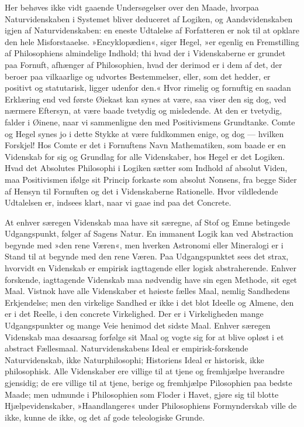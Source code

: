 \documentclass[12pt]{book}
\newcommand{\apage}[1]{\marginnote{\footnotesize\textit{[#1]}}}
\begin{document}
Her behøves ikke vidt gaaende Undersøgelser over den Maade, hvorpaa
Naturvidenskaben i Systemet bliver deduceret af Logiken, og
Aandsvidenskaben igjen af Naturvidenskaben: en eneste Udtalelse af
Forfatteren er nok til at opklare den hele Misforstaaelse. »Encyklopædien«,
siger Hegel, »er egenlig en Fremstilling af Philosophiens almindelige
Indhold; thi hvad der i Videnskaberne er grundet paa Fornuft, afhænger af
Philosophien, hvad der derimod er i dem af det, der beroer paa vilkaarlige
og udvortes Bestemmelser, eller, som det hedder, er positivt og statutarisk,
ligger udenfor den.« Hvor rimelig og fornuftig en saadan Erklæring end ved
første Øiekast kan synes at være, saa viser den sig dog, ved nærmere
Eftersyn, at være baade tvetydig og misledende. At den er tvetydig, falder
i Øinene, naar vi sammenligne den med Positivismens Grundtanke. Comte og
Hegel synes jo i dette Stykke at være fuldkommen enige, og dog --- hvilken Forskjel! Hos Comte er det i Fornuftens Navn Mathematiken, som baade er en
Videnskab for sig og Grundlag for alle Videnskaber, hos Hegel er det
Logiken. Hvad det Absolutes Philosophi i Logiken sætter som Indhold af
absolut Viden, maa Positivismen \apage{89} ifølge sit Princip forkaste som absolut
Nonsens, fra begge Sider af Hensyn til Fornuften og det i Videnskaberne
Rationelle. Hvor vildledende Udtalelsen er, indsees klart, naar vi gaae ind
paa det Concrete.

At enhver særegen Videnskab maa have sit særegne, af Stof og Emne betingede
Udgangspunkt, følger af Sagens Natur. En immanent Logik kan ved Abstraction
begynde med »den rene Væren«, men hverken Astronomi eller Mineralogi er i
Stand til at begynde med den rene Væren. Paa Udgangspunktet sees det strax,
hvorvidt en Videnskab er empirisk iagttagende eller logisk abstraherende.
Enhver forskende, iagttagende Videnskab maa nødvendig have sin egen
Methode, sit eget Maal. Vistnok have alle Videnskaber et høieste fælles
Maal, nemlig Sandhedens Erkjendelse; men den virkelige Sandhed er ikke i
det blot Ideelle og Almene, den er i det Reelle, i den concrete
Virkelighed. Der er i Virkeligheden mange Udgangspunkter og mange Veie
henimod det sidste Maal. Enhver særegen Videnskab maa desaarsag forfølge
sit Maal og vogte sig for at blive opløst i et abstract Fællesmaal.
Naturvidenskabens Ideal er empirisk-forskende Naturvidenskab, ikke
Naturphilosophi; Historiens Ideal er historisk, ikke philosophisk. Alle
Videnskaber ere villige til at tjene og fremhjælpe hverandre gjensidig; de
ere villige til at tjene, berige og fremhjælpe Pilosophien paa bedste
Maade; men udmunde i Philosophien som Floder i Havet, gjøre sig til blotte
Hjælpevidenskaber, »Haandlangere« under Philosophiens Formynderskab \apage{90} ville
de ikke, kunne de ikke, og det af gode teleologiske Grunde.
\end{document}
